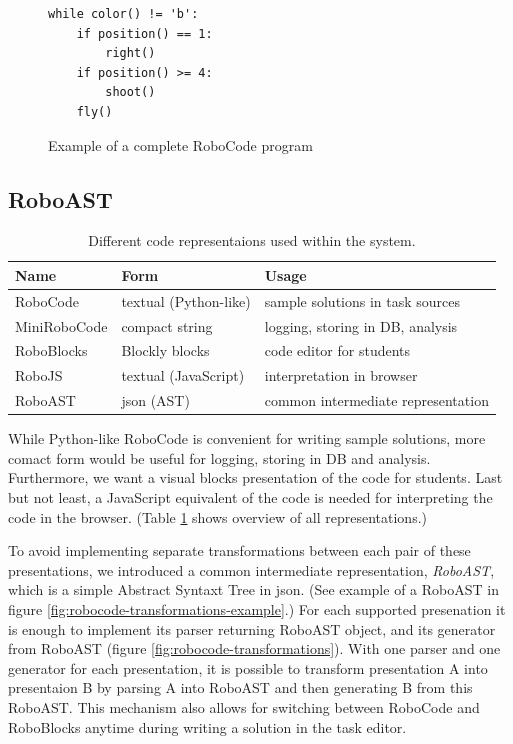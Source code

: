 \begin{figure}[h]
\begin{lstlisting}
while color() != 'b':
    if position() == 1:
        right()
    if position() >= 4:
        shoot()
    fly()
\end{lstlisting}
\caption{Example of a complete RoboCode program}
\label{fig:robocode-example}
\end{figure}


\subsection{RoboAST}

\begin{table}[h]
\begin{center}
\begin{tabular}{l l l}
\toprule
Name & Form & Usage  \\
\midrule
RoboCode     & textual (Python-like) & sample solutions in task sources  \\
MiniRoboCode & compact string & logging, storing in DB, analysis  \\
RoboBlocks   & Blockly blocks & code editor for students  \\
RoboJS       & textual (JavaScript) & interpretation in browser  \\
RoboAST      & json (AST) & common intermediate representation \\
\bottomrule
\end{tabular}
\end{center}
\caption{Different code representaions used within the system.}
\label{tbl:code-representation}
\end{table}

While Python-like RoboCode is convenient for writing sample solutions,
more comact form would be useful for logging, storing in DB and analysis.
Furthermore, we want a visual blocks presentation of the code for students.
Last but not least, a JavaScript equivalent of the code is needed for
interpreting the code in the browser.
(Table \ref{tbl:code-representation} shows overview of all representations.)

To avoid implementing separate transformations between each pair of these
presentations, we introduced a common intermediate representation,
\emph{RoboAST}, which is a simple Abstract Syntaxt Tree in json.
(See example of a RoboAST in figure \ref{fig:robocode-transformations-example}.)
For each supported presenation it is enough to implement
its parser returning RoboAST object, and
its generator from RoboAST (figure \ref{fig:robocode-transformations}).
With one parser and one generator for each presentation,
it is possible to transform presentation A
into presentaion B by parsing A into RoboAST and
then generating B from this RoboAST.
This mechanism also allows for switching between RoboCode and RoboBlocks
anytime during writing a solution in the task editor.

